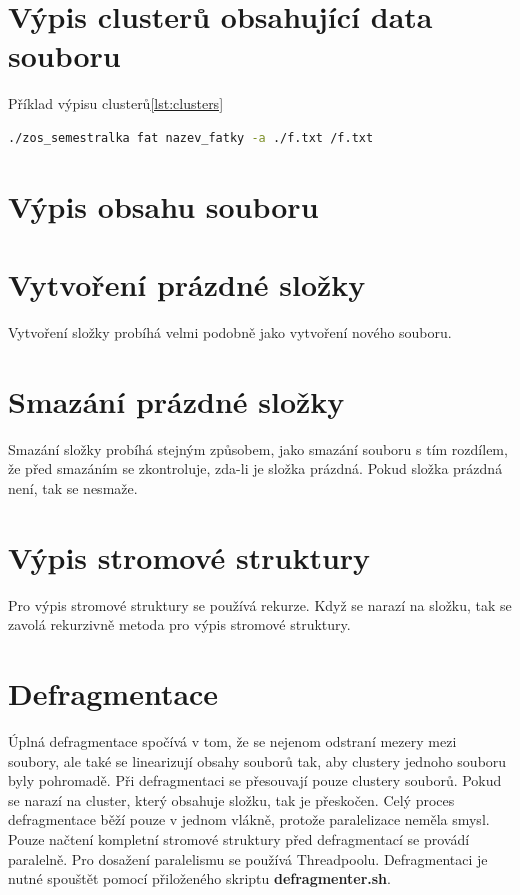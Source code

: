 \documentclass{report}
\begin{document}
\section*{Výpis clusterů obsahující data souboru}
Příklad výpisu clusterů\ref{lst:clusters}
\begin{lstlisting}[caption=Výpis clusterů obsahující data souboru,label=lst:clusters, language=bash]
./zos_semestralka fat nazev_fatky -a ./f.txt /f.txt
 \end{lstlisting}

\section*{Výpis obsahu souboru}


\section*{Vytvoření prázdné složky}
Vytvoření složky probíhá velmi podobně jako vytvoření nového souboru.

\section*{Smazání prázdné složky}
Smazání složky probíhá stejným způsobem, jako smazání souboru s tím rozdílem, že před smazáním se zkontroluje, zda-li je složka prázdná. Pokud složka prázdná není, tak se nesmaže.

\section*{Výpis stromové struktury}
Pro výpis stromové struktury se používá rekurze. Když se narazí na složku, tak se zavolá rekurzivně metoda pro výpis stromové struktury.

\section*{Defragmentace}
Úplná defragmentace spočívá v tom, že se nejenom odstraní mezery mezi soubory, ale také se linearizují obsahy souborů tak, aby clustery jednoho souboru byly pohromadě.
Při defragmentaci se přesouvají pouze clustery souborů. Pokud se narazí na cluster, který obsahuje složku, tak je přeskočen. Celý proces defragmentace běží pouze v jednom vlákně, protože paralelizace neměla smysl. Pouze načtení kompletní stromové struktury před defragmentací se provádí paralelně. Pro dosažení paralelismu se používá Threadpoolu. Defragmentaci je nutné spouštět pomocí přiloženého skriptu \textbf{defragmenter.sh}.
\end{document}
